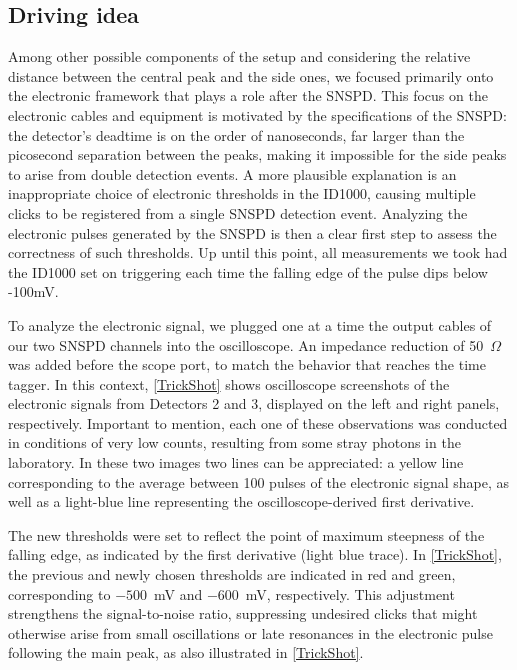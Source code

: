 \subsection{Driving idea}
Among other possible components of the setup and considering the relative distance between the central peak and the side ones, we focused primarily onto the electronic framework that plays a role after the SNSPD.
This focus on the electronic cables and equipment is motivated by the specifications of the SNSPD: the detector’s deadtime is on the order of nanoseconds, far larger than the picosecond separation between the peaks, making it impossible for the side peaks to arise from double detection events.
A more plausible explanation is an inappropriate choice of electronic thresholds in the ID1000, causing multiple clicks to be registered from a single SNSPD detection event.
Analyzing the electronic pulses generated by the SNSPD is then a clear first step to assess the correctness of such thresholds.
Up until this point, all measurements we took had the ID1000 set on triggering each time the falling edge of the pulse dips below -100mV.

To analyze the electronic signal, we plugged one at a time the output cables of our two SNSPD channels into the oscilloscope. An impedance reduction of 50~$\Omega$ was added before the scope port, to match the behavior that reaches the time tagger.
In this context, \autoref{TrickShot} shows oscilloscope screenshots of the electronic signals from Detectors 2 and 3, displayed on the left and right panels, respectively.
Important to mention, each one of these observations was conducted in conditions of very low counts, resulting from some stray photons in the laboratory.
In these two images two lines can be appreciated: a yellow line corresponding to the average between 100 pulses of the electronic signal shape, as well as a light-blue line representing the oscilloscope-derived first derivative.

The new thresholds were set to reflect the point of maximum steepness of the falling edge, as indicated by the first derivative (light blue trace).
In \autoref{TrickShot}, the previous and newly chosen thresholds are indicated in red and green, corresponding to \(-500\)~mV and \(-600\)~mV, respectively.
This adjustment strengthens the signal-to-noise ratio, suppressing undesired clicks that might otherwise arise from small oscillations or late resonances in the electronic pulse following the main peak, as also illustrated in \autoref{TrickShot}.




